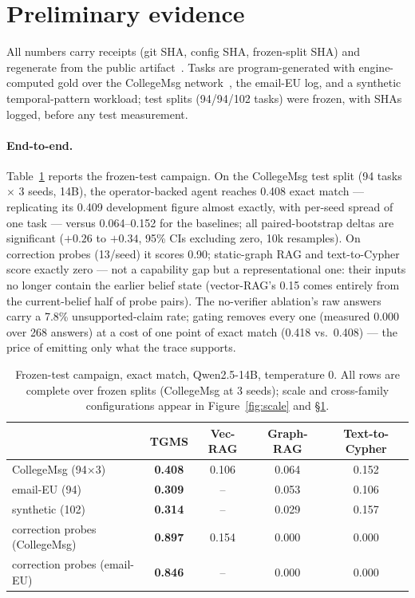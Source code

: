 \documentclass[sigconf]{acmart}
\begin{document}
\section{Preliminary evidence}
\label{sec:eval}

All numbers carry receipts (git SHA, config SHA, frozen-split SHA) and
regenerate from the public artifact~\cite{tgms2026}. Tasks are
program-generated with engine-computed gold over the CollegeMsg
network~\cite{panzarasa2009}, the email-EU log, and a synthetic
temporal-pattern workload; test splits (94/94/102 tasks) were frozen,
with SHAs logged, before any test measurement.

\paragraph{End-to-end.}
Table~\ref{tab:e2e} reports the frozen-test campaign. On the CollegeMsg
test split (94 tasks $\times$ 3 seeds, 14B), the operator-backed agent
reaches 0.408 exact match --- replicating its 0.409 development figure
almost exactly, with per-seed spread of one task --- versus 0.064--0.152
for the baselines; all paired-bootstrap deltas are significant
($+0.26$ to $+0.34$, 95\% CIs excluding zero, 10k resamples). On
correction probes (13/seed) it scores 0.90; static-graph RAG and
text-to-Cypher score exactly zero --- not a capability gap but a
representational one: their inputs no longer contain the earlier belief
state (vector-RAG's 0.15 comes entirely from the current-belief half of
probe pairs). The no-verifier ablation's raw answers carry a 7.8\%
unsupported-claim rate; gating removes every one (measured 0.000 over
268 answers) at a cost of one point of exact match (0.418 vs.\ 0.408)
--- the price of emitting only what the trace supports.

\begin{table}[t]
\centering\small
\caption{Frozen-test campaign, exact match, Qwen2.5-14B, temperature 0.
All rows are complete over frozen splits (CollegeMsg at 3 seeds);
scale and cross-family configurations appear in Figure~\ref{fig:scale}
and \S\ref{sec:eval}.}
\label{tab:e2e}
\begin{tabular}{lcccc}
\toprule
 & TGMS & Vec-RAG & Graph-RAG & Text-to-Cypher \\
\midrule
CollegeMsg (94$\times$3) & \textbf{0.408} & 0.106 & 0.064 & 0.152 \\
email-EU (94)   & \textbf{0.309} & --      & 0.053 & 0.106 \\
synthetic (102) & \textbf{0.314} & --      & 0.029 & 0.157 \\
correction probes (CollegeMsg) & \textbf{0.897} & 0.154 & 0.000 & 0.000 \\
correction probes (email-EU) & \textbf{0.846} & -- & 0.000 & 0.000 \\
\bottomrule
\end{tabular}
\end{table}
\end{document}
